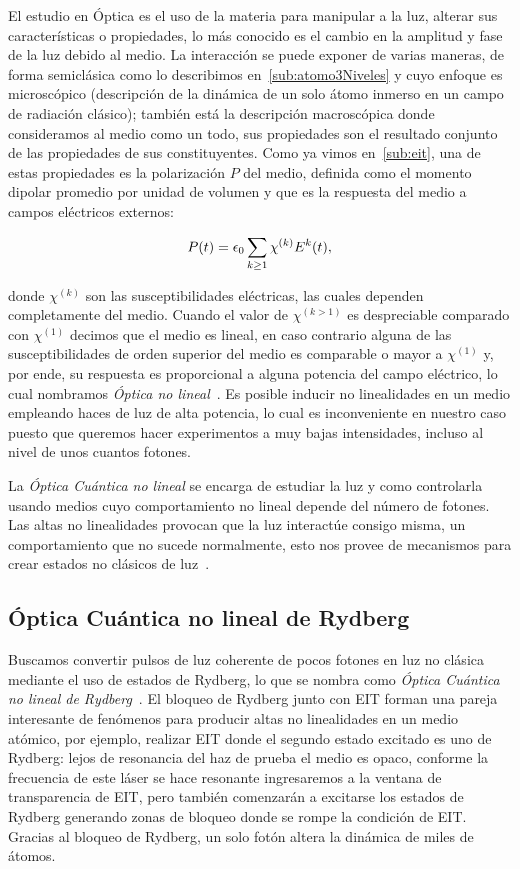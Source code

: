 El estudio en Óptica es el uso de la materia para manipular a la luz, alterar sus características o propiedades, lo más conocido es el cambio en la amplitud y fase de la luz debido al medio. La interacción se puede exponer de varias maneras, de forma semiclásica como lo describimos en~\ref{sub:atomo3Niveles} y cuyo enfoque es microscópico (descripción de la dinámica de un solo átomo inmerso en un campo de radiación clásico); también está la descripción macroscópica donde consideramos al medio como un todo, sus propiedades son el resultado conjunto de las propiedades de sus constituyentes. Como ya vimos en~\ref{sub:eit}, una de estas propiedades es la polarización $P$ del medio, definida como el momento dipolar promedio por unidad de volumen y que es la respuesta del medio a campos eléctricos externos:

\begin{equation}
\label{ec:polarizacion}
P(t)=\epsilon_{0}\sum_{k\geq1}\chi^{(k)}E^{k}(t),
\end{equation}

donde $\chi^{(k)}$ son las susceptibilidades eléctricas, las cuales dependen completamente del medio. Cuando el valor de $\chi^{(k>1)}$ es despreciable comparado con $\chi^{(1)}$ decimos que el medio es lineal, en caso contrario alguna de las susceptibilidades de orden superior del medio es comparable o mayor a $\chi^{(1)}$ y, por ende, su respuesta es proporcional a alguna potencia del campo eléctrico, lo cual nombramos \emph{Óptica no lineal}~\cite{boyd}. Es posible inducir no linealidades en un medio empleando haces de luz de alta potencia, lo cual es inconveniente en nuestro caso puesto que queremos hacer experimentos a muy bajas intensidades, incluso al nivel de unos cuantos fotones.

\p La \emph{Óptica Cuántica no lineal} se encarga de estudiar la luz y como controlarla usando medios cuyo comportamiento no lineal depende del número de fotones. Las altas no linealidades provocan que la luz interactúe consigo misma, un comportamiento que no sucede normalmente, esto nos provee de mecanismos para crear estados no clásicos de luz~\cite{peyronel,kumlin}.

\subsection{\label{sub:opticaCuanticaNoLinealRydberg}Óptica Cuántica no lineal de Rydberg}

Buscamos convertir pulsos de luz coherente de pocos fotones en luz no clásica mediante el uso de estados de Rydberg, lo que se nombra como \emph{Óptica Cuántica no lineal de Rydberg}~\cite{firstenberg1}. El bloqueo de Rydberg junto con EIT forman una pareja interesante de fenómenos para producir altas no linealidades en un medio atómico, por ejemplo, realizar EIT donde el segundo estado excitado es uno de Rydberg: lejos de resonancia del haz de prueba el medio es opaco, conforme la frecuencia de este láser se hace resonante ingresaremos a la ventana de transparencia de EIT, pero también comenzarán a excitarse los estados de Rydberg generando zonas de bloqueo donde se rompe la condición de EIT. Gracias al bloqueo de Rydberg, un solo fotón altera la dinámica de miles de átomos.

